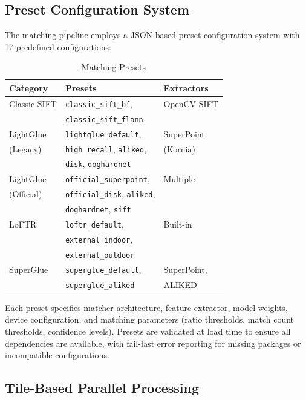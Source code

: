 \documentclass[lettersize,journal]{IEEEtran}
\begin{document}
\subsection{Preset Configuration System}

The matching pipeline employs a JSON-based preset configuration system with 17 predefined configurations:

\begin{table}[htbp]
\caption{Matching Presets}
\label{tab:presets}
\centering
\small
\begin{tabular}{@{}lll@{}}
\toprule
\textbf{Category} & \textbf{Presets} & \textbf{Extractors} \\
\midrule
Classic SIFT & \texttt{classic\_sift\_bf}, & OpenCV SIFT \\
 & \texttt{classic\_sift\_flann} &  \\
LightGlue & \texttt{lightglue\_default}, & SuperPoint \\
(Legacy) & \texttt{high\_recall}, \texttt{aliked}, & (Kornia) \\
 & \texttt{disk}, \texttt{doghardnet} &  \\
LightGlue & \texttt{official\_superpoint}, & Multiple \\
(Official) & \texttt{official\_disk}, \texttt{aliked}, &  \\
 & \texttt{doghardnet}, \texttt{sift} &  \\
LoFTR & \texttt{loftr\_default}, & Built-in \\
 & \texttt{external\_indoor}, &  \\
 & \texttt{external\_outdoor} &  \\
SuperGlue & \texttt{superglue\_default}, & SuperPoint, \\
 & \texttt{superglue\_aliked} & ALIKED \\
\bottomrule
\end{tabular}
\end{table}

Each preset specifies matcher architecture, feature extractor, model weights, device configuration, and matching parameters (ratio thresholds, match count thresholds, confidence levels). Presets are validated at load time to ensure all dependencies are available, with fail-fast error reporting for missing packages or incompatible configurations.

\subsection{Tile-Based Parallel Processing}
\end{document}
